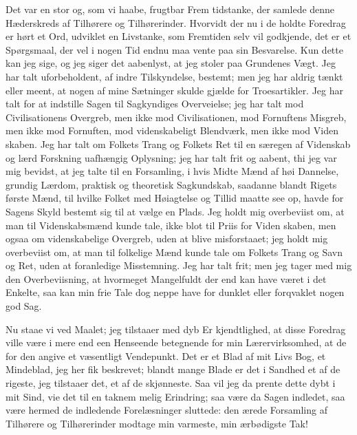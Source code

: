 \documentclass[12pt]{book}
\newcommand{\opage}[1]{\marginnote{\footnotesize\textit{[#1]}}}
\begin{document}
Det var en stor og, som vi haabe, frugtbar Frem\-%
tidstanke, der samlede denne Hæderskreds af Tilhørere
og Tilhørerinder. Hvorvidt der nu i de holdte Foredrag
er hørt et Ord, udviklet en Livstanke, som Fremtiden
selv vil godkjende, det er et Spørgsmaal, der vel i nogen
Tid endnu maa vente paa sin Besvarelse. Kun dette
kan jeg sige, og jeg siger det aabenlyst, at jeg stoler
paa Grundenes Vægt. Jeg har talt uforbeholdent,
af indre Tilskyndelse, bestemt; men jeg har aldrig
tænkt eller meent, at nogen af mine Sætninger skulde
gjælde for Troesartikler. Jeg har talt for at indstille
Sagen til Sagkyndiges Overveielse; jeg har talt mod
Civilisationens Overgreb, men ikke mod Civilisationen,
mod Fornuftens Misgreb, men ikke mod Fornuften,
mod videnskabeligt Blendværk, men ikke mod Viden\-%
\opage{295}\setcounter{footnote}{0}%
skaben. Jeg har talt om Folkets Trang og Folkets Ret
til en særegen af Videnskab og lærd Forskning uafhængig
Oplysning; jeg har talt frit og aabent, thi jeg var mig
bevidst, at jeg talte til en Forsamling, i hvis Midte
Mænd af høi Dannelse, grundig Lærdom, praktisk og
theoretisk Sagkundskab, saadanne blandt Rigets første
Mænd, til hvilke Folket med Høiagtelse og Tillid maatte
see op, havde for Sagens Skyld bestemt sig til at vælge
en Plads. Jeg holdt mig overbeviist om, at man til
Videnskabsmænd kunde tale, ikke blot til Priis for Viden\-%
skaben, men ogsaa om videnskabelige Overgreb, uden
at blive misforstaaet; jeg holdt mig overbeviist om, at
man til folkelige Mænd kunde tale om Folkets Trang og
Savn og Ret, uden at foranledige Misstemning. Jeg
har talt frit; men jeg tager med mig den Overbeviisning,
at hvormeget Mangelfuldt der end kan have været i det
Enkelte, saa kan min frie Tale dog neppe have for\-%
dunklet eller forqvaklet nogen god Sag.

Nu staae vi ved Maalet; jeg tilstaaer med dyb Er\-%
kjendtlighed, at disse Foredrag ville være i mere end
een Henseende betegnende for min Lærervirksomhed, at
de for den angive et væsentligt Vendepunkt. Det er et
Blad af mit Livs Bog, et Mindeblad, jeg her fik beskrevet;
blandt mange Blade er det i Sandhed et af de rigeste,
jeg tilstaaer det, et af de skjønneste. Saa vil jeg da
prente dette dybt i mit Sind, vie det til en taknem\-%
melig Erindring; saa være da Sagen indledet, saa være
hermed de indledende Forelæsninger sluttede: den ærede
Forsamling af Tilhørere og Tilhørerinder modtage min
varmeste, min ærbødigste Tak!
\end{document}
